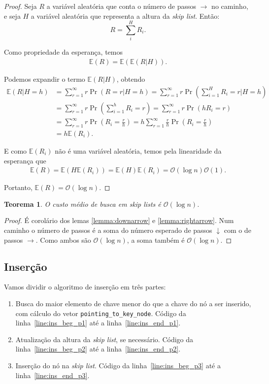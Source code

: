 \documentclass[paper=a4, fontsize=11pt]{scrartcl} %
\newtheorem{theorem}{Teorema}
\numberwithin{equation}{section}
\numberwithin{figure}{section}
\numberwithin{table}{section}
\numberwithin{definition}{section}
\numberwithin{theorem}{section}
\numberwithin{property}{section}
\numberwithin{proposition}{section}
\newcommand{\cO}{\ensuremath{\mathcal{O}}}
\newcommand{\sls}{\textit{skip lists}\xspace}
\newcommand{\skl}{\textit{skip list}\xspace}
\renewcommand{\sl}{\textit{skip list}\xspace}
\newcommand{\Exp}{\ensuremath{{\mathbb{E}}}\xspace}
\begin{document}
\begin{proof}
Seja $R$ a variável aleatória que conta o número de passos $\rightarrow$ no caminho, 
e seja $H$ a variável aleatória que representa a altura da \skl. Então:
$$
R = \sum_i^H R_i.
$$

Como propriedade da esperança, temos
\begin{align*}
\Exp(R) = \Exp(\Exp(R|H)).
\end{align*}

Podemos expandir o termo $\Exp(R|H)$, obtendo
\begin{align*}
\Exp(R|H = h)
  &= \sum_{r = 1}^{\infty} r \Pr(R = r | H = h) 
   = \sum_{r = 1}^{\infty} r \Pr \left( \sum_{i=1}^{H} R_i = r | H = h \right) \\
  &= \sum_{r = 1}^{\infty} r \Pr \left( \sum_{i=1}^{h} R_i = r \right) 
   = \sum_{r = 1}^{\infty} r \Pr \left( hR_i = r \right) \\
  &= \sum_{r = 1}^{\infty} r \Pr \left( R_i = \frac{r}{h} \right)   
   = h\sum_{r = 1}^{\infty} \frac{r}{h} \Pr \left( R_i = \frac{r}{h} \right) \\
  &= h \Exp(R_i).
\end{align*}

E como $\Exp(R_i)$ não é uma variável aleatória, temos pela linearidade da esperança que
\begin{align*}
\Exp(R) = \Exp(H \Exp(R_i)) = \Exp(H)\Exp(R_i)= \cO(\log n) \cO(1).
\end{align*}

Portanto, $\Exp(R) = \cO(\log n).$

\end{proof}

\begin{theorem}
O custo médio de busca em \sls é $\cO(\log n)$. 
\end{theorem}

\begin{proof}
É corolário dos lemas \ref{lemma:downarrow} e \ref{lemma:rightarrow}. Num caminho o número de passos
é a soma do número esperado de passos $\downarrow$ com o de passos $\rightarrow$. Como ambos são
$\cO(\log n)$, a soma também é $\cO(\log n)$.
\end{proof}

\subsection{Inserção}

Vamos dividir o algoritmo de inserção em três partes:
\begin{enumerate}[noitemsep]
  \item Busca do maior elemento de chave menor do que a chave do nó a ser inserido, com cálculo do vetor 
    \verb|pointing_to_key_node|. Código da linha~\ref{line:ins_beg_p1} até a linha~\ref{line:ins_end_p1}.
  \item Atualização da altura da \sl, se necessário. 
      Código da linha~\ref{line:ins_beg_p2} até a linha~\ref{line:ins_end_p2}.
  \item Inserção do nó na \sl. Código da linha~\ref{line:ins_beg_p3} até a linha~\ref{line:ins_end_p3}. 
\end{enumerate}
\end{document}
